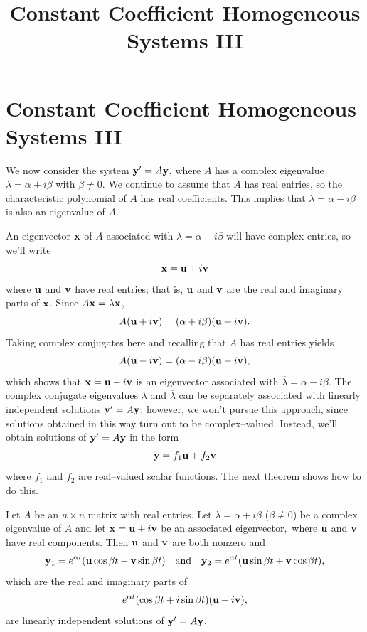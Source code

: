 \documentclass{ximera}
\title{Constant Coefficient Homogeneous Systems III}%
\begin{document}
\begin{abstract}

\end{abstract}

\maketitle

\section*{Constant Coefficient Homogeneous Systems III}

We now consider the system ${\bf y}'=A{\bf y}$, where $A$ has a complex
eigenvalue $\lambda=\alpha+i\beta$ with $\beta\ne0$. We continue to
assume that $A$ has real entries, so the characteristic polynomial of
$A$ has real coefficients. This implies that
$\overline\lambda=\alpha-i\beta$ is also an eigenvalue of $A$.

An eigenvector ${\bf x}$ of $A$ associated with
$\lambda=\alpha+i\beta$ will have complex entries, so we'll write
$$
{\bf x}={\bf u}+i{\bf v}
$$
where ${\bf u}$ and ${\bf v}$ have real entries; that is, ${\bf u}$
and ${\bf v}$ are the real and imaginary parts of ${\bf x}$. Since
$A{\bf x}=\lambda {\bf x}$,
\begin{equation} \label{eq:10.6.1}
A({\bf u}+i{\bf v})=(\alpha+i\beta)({\bf u}+i{\bf v}).
\end{equation}
Taking complex conjugates here and recalling that $A$ has real entries
yields
$$
A({\bf u}-i{\bf v})=(\alpha-i\beta)({\bf u}-i{\bf v}),
$$
which shows that ${\bf x}={\bf u}-i{\bf v}$ is an eigenvector
associated with $\overline{\lambda}=\alpha-i\beta$. The complex
conjugate eigenvalues $\lambda$ and $\overline{\lambda}$ can be
separately associated with linearly independent solutions ${\bf
y}'=A{\bf y}$;     however, we won't pursue this approach, since solutions
obtained in this way turn out to be complex--valued. Instead, we'll
obtain solutions of ${\bf y}'=A{\bf y}$ in the form
\begin{equation} \label{eq:10.6.2}
{\bf y}=f_1{\bf u}+f_2{\bf v}
\end{equation}
where $f_1$ and $f_2$ are real--valued scalar functions.
The next theorem shows how to do this.
\begin{theorem}\label{thmtype:10.6.1}
Let $A$ be an $n\times n$ matrix with real entries$.$ Let
$\lambda=\alpha+i\beta$ ($\beta\neq 0$) be a complex
eigenvalue of $A$ and let ${\bf x}={\bf u}+i{\bf v}$ be an associated
eigenvector$,$ where ${\bf u}$ and ${\bf v}$ have real components$.$ Then
${\bf u}$ and ${\bf v}$ are both nonzero and
$$
{\bf y}_1=e^{\alpha t}({\bf u}\cos\beta t-{\bf v}\sin\beta t)
\quad\mbox{and}\quad
{\bf y}_2=e^{\alpha t}({\bf u}\sin\beta t+{\bf v}\cos\beta t),
$$
which are the real and imaginary parts of
\begin{equation} \label{eq:10.6.3}
e^{\alpha t}(\cos\beta t+i\sin\beta t)({\bf u}+i{\bf v}),
\end{equation}
are linearly independent solutions of  ${\bf y}'=A{\bf y}$.
\end{theorem}
\end{document}
